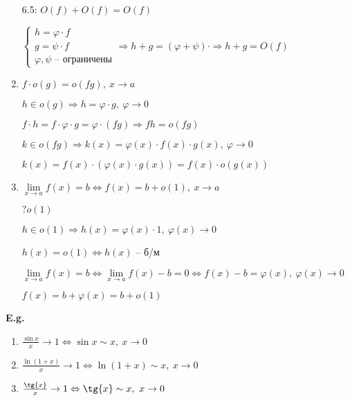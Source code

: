 \documentclass[14pt, letter paper]{article}
\begin{document}
\begin{enumerate}
    6.5: $O(f) + O(f) = O(f)$

    $\begin{cases}
        h = \varphi \cdot f \\
        g = \psi \cdot f \\
        \varphi, \psi \text{ -- ограничены}
    \end{cases} \Rightarrow h + g = (\varphi + \psi) \cdot \Rightarrow h + g = O(f)$

    \item $f \cdot o(g) = o(fg),\ x \rightarrow a$

    $h \in o(g) \Rightarrow h = \varphi \cdot g,\ \varphi \rightarrow 0$

    $f \cdot h = f \cdot \varphi \cdot g = \varphi \cdot (fg) \Rightarrow fh = o(fg)$

    $k \in o(fg) \Rightarrow k(x) = \varphi(x) \cdot f(x) \cdot g(x),\ \varphi \rightarrow 0$

    $k(x) = f(x) \cdot (\varphi(x) \cdot g(x)) = f(x) \cdot o(g(x))$

    \item $\lim\limits_{x \rightarrow a}{f(x)} = b \Leftrightarrow f(x) = b + o(1),\ x \rightarrow a$

    $? o(1)$

    $h \in o(1) \Rightarrow h(x) = \varphi(x) \cdot 1,\ \varphi(x) \rightarrow 0$

    $h(x) = o(1) \Leftrightarrow h(x)$ -- б/м

    $\lim\limits_{x \rightarrow a}{f(x)} = b \Leftrightarrow \lim\limits_{x \rightarrow a}{f(x)-b} = 0 \Leftrightarrow f(x) - b = \varphi(x),\ \varphi(x) \rightarrow 0$

    $f(x) = b + \varphi(x) = b + o(1)$
\end{enumerate}

\vspace{5mm}

\textbf{E.g.}

\begin{enumerate}
    \item $\frac{\sin{x}}{x} \rightarrow 1 \Leftrightarrow \sin{x} \sim x,\ x \rightarrow 0$

    \item $\frac{\ln{(1+x)}}{x} \rightarrow 1 \Leftrightarrow \ln{(1+x)} \sim x,\ x \rightarrow 0$

    \item $\frac{\tg{x}}{x} \rightarrow 1 \Leftrightarrow \tg{x} \sim x,\ x \rightarrow 0$
\end{enumerate}
\end{document}
